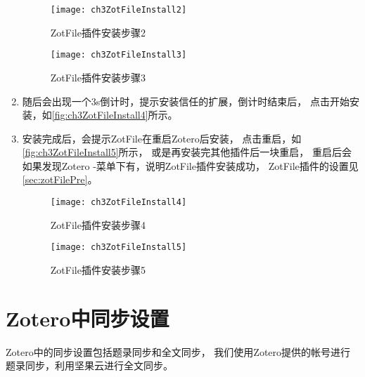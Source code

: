 \documentclass[cn,11pt,chinese]{elegantbook}
\begin{document}
\begin{enumerate}
			\begin{figure}[htbp]
				\begin{minipage}[t]{0.6\linewidth}
					\centering
					\texttt{[image: ch3ZotFileInstall2]}
					\caption{ZotFile插件安装步骤2}
					\label{fig:ch3ZotFileInstall2}
				\end{minipage}
				\begin{minipage}[t]{0.3\linewidth}
					\centering
					\texttt{[image: ch3ZotFileInstall3]}
					\caption{ZotFile插件安装步骤3}
					\label{fig:ch3ZotFileInstall3}
				\end{minipage}
			\end{figure}
			\item
			随后会出现一个3s倒计时，提示安装信任的扩展，倒计时结束后，
			点击开始安装，如\autoref{fig:ch3ZotFileInstall4}所示。
			\item
			安装完成后，会提示ZotFile在重启Zotero后安装，
			点击重启，如\autoref{fig:ch3ZotFileInstall5}所示，
			或是再安装完其他插件后一块重启，
			重启后会如果发现Zotero -菜单下有，说明ZotFile插件安装成功，
			ZotFile插件的设置见\cref{sec:zotFilePre}。
			\begin{figure}[htbp]
				\centering
				\texttt{[image: ch3ZotFileInstall4]}
				\caption{ZotFile插件安装步骤4}
				\label{fig:ch3ZotFileInstall4}
			\end{figure}
			
			\begin{figure}[htbp]
				\centering
				\texttt{[image: ch3ZotFileInstall5]}
				\caption{ZotFile插件安装步骤5}
				\label{fig:ch3ZotFileInstall5}
			\end{figure}
		\end{enumerate}
		
	\section{Zotero中同步设置}\label{sec:syn}
		Zotero中的同步设置包括题录同步和全文同步，
		我们使用Zotero提供的帐号进行题录同步，利用坚果云进行全文同步。
		
\end{document}
